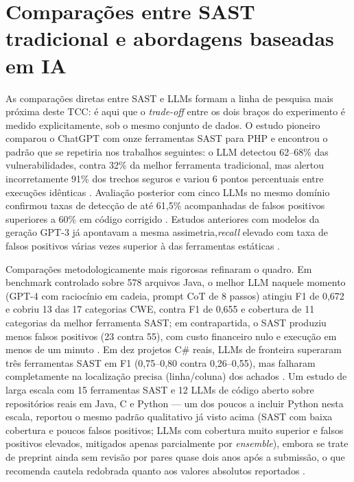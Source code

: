 \section{Comparações entre SAST tradicional e abordagens baseadas em IA}\label{sec:comparacoes-sast-ia}
As comparações diretas entre SAST e LLMs formam a linha de pesquisa mais próxima deste TCC: é aqui que o \textit{trade-off} entre os dois braços do experimento é medido explicitamente, sob o mesmo conjunto de dados. O estudo pioneiro comparou o ChatGPT com onze ferramentas SAST para PHP e encontrou o padrão que se repetiria nos trabalhos seguintes: o LLM detectou 62–68\% das vulnerabilidades, contra 32\% da melhor ferramenta tradicional, mas alertou incorretamente 91\% dos trechos seguros e variou 6 pontos percentuais entre execuções idênticas \cite{Ozturk2023AIvsSAST}. Avaliação posterior com cinco LLMs no mesmo domínio confirmou taxas de detecção de até 61,5\% acompanhadas de falsos positivos superiores a 60\% em código corrigido \cite{Cetin2024LLMPHP}. Estudos anteriores com modelos da geração GPT-3 já apontavam a mesma assimetria,\textit{recall} elevado com taxa de falsos positivos várias vezes superior à das ferramentas estáticas \cite{Purba2023LLMVuln}.

Comparações metodologicamente mais rigorosas refinaram o quadro. Em benchmark controlado sobre 578 arquivos Java, o melhor LLM naquele momento (GPT-4 com raciocínio em cadeia, prompt CoT de 8 passos) atingiu F1 de 0,672 e cobriu 13 das 17 categorias CWE, contra F1 de 0,655 e cobertura de 11 categorias da melhor ferramenta SAST; em contrapartida, o SAST produziu menos falsos positivos (23 contra 55), com custo financeiro nulo e execução em menos de um minuto \cite{Tamberg2025LLMHarness}. Em dez projetos C\# reais, LLMs de fronteira superaram três ferramentas SAST em F1 (0,75–0,80 contra 0,26–0,55), mas falharam completamente na localização precisa (linha/coluna) dos achados \cite{Gnieciak2025LLMvsSAST}. Um estudo de larga escala com 15 ferramentas SAST e 12 LLMs de código aberto sobre repositórios reais em Java, C e Python — um dos poucos a incluir Python nesta escala, reportou o mesmo padrão qualitativo já visto acima (SAST com baixa cobertura e poucos falsos positivos; LLMs com cobertura muito superior e falsos positivos elevados, mitigados apenas parcialmente por \textit{ensemble}), embora se trate de preprint ainda sem revisão por pares quase dois anos após a submissão, o que recomenda cautela redobrada quanto aos valores absolutos reportados \cite{Zhou2024SASTLLMRepo}.

